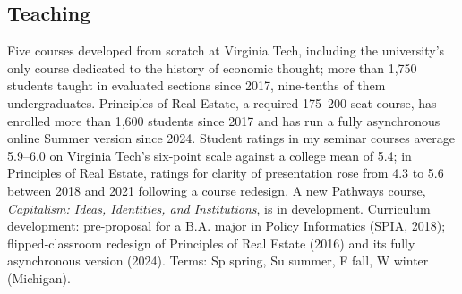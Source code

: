 \documentclass[letter,11pt]{article}
\begin{document}
\subsection*{Teaching}
\noindent Five courses developed from scratch at Virginia Tech, including the university's only course dedicated to the history of economic thought; more than 1,750 students taught in evaluated sections since 2017, nine-tenths of them undergraduates. Principles of Real Estate, a required 175--200-seat course, has enrolled more than 1,600 students since 2017 and has run a fully asynchronous online Summer version since 2024. Student ratings in my seminar courses average 5.9--6.0 on Virginia Tech's six-point scale against a college mean of 5.4; in Principles of Real Estate, ratings for clarity of presentation rose from 4.3 to 5.6 between 2018 and 2021 following a course redesign. A new Pathways course, \emph{Capitalism: Ideas, Identities, and Institutions}, is in development. Curriculum development: pre-proposal for a B.A. major in Policy Informatics (SPIA, 2018); flipped-classroom redesign of Principles of Real Estate (2016) and its fully asynchronous version (2024). Terms: Sp spring, Su summer, F fall, W winter (Michigan).
\medskip
\end{document}
